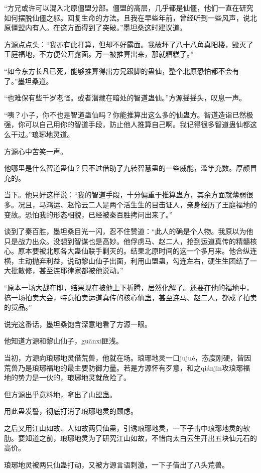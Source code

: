 \begin{this_body}
“方兄或许可以混入北原僵盟分部。僵盟的高层，几乎都是仙僵，他们一直在研究如何摆脱仙僵之躯。回复生命的方法。且我在早些年前，曾经听到一些风声，说北原僵盟内有人。在这方面得到了突破。”墨坦桑这时建议道。

方源点点头：“我亦有此打算，但却不好露面。我破坏了八十八角真阳楼，毁灭了王庭福地，不方便公开露面。万一被推算出来，那就糟糕了。”

“如今东方长凡已死，能够推算得出方兄跟脚的蛊仙，整个北原恐怕都不会有了。”墨坦桑道。

“也难保有些千岁老怪。或者潜藏在暗处的智道蛊仙。”方源摇摇头，叹息一声。

“咦？小子，你不也是智道蛊仙吗？你能推算出这么多的仙蛊方。智道造诣已然极强，你可以自己用你的智道手段，防止他人推算自己啊。我记得很多智道蛊仙都这么干过。”琅琊地灵道。

方源心中苦笑一声。

他哪里是什么智道蛊仙？只不过借助了九转智慧蛊的一些威能，滥竽充数。厚颜冒充的。

当下。他只好这样说：“我的智道手段，十分偏重于推算蛊方，其余方面就薄弱很多。况且，马鸿运、赵怜云二人是两个活生生的目击证人，亲身经历了王庭福地的变故。恐怕我的形态相貌，已经被秦百胜拷问出来了。”

谈到了秦百胜，墨坦桑目光一闪，忍不住赞道：“此人的确是个人物。我原以为他只是战力出众。没想到智谋也是高妙。他俘虏马、赵二人，抢到运道真传的精髓核心。原本要被北原各大蛊仙联手剿灭的。结果北原时间的这一个多月来。他合纵连横，主动抛弃利益，说动黎山仙子出面，利用山盟蛊，勾连左右，硬生生团结了一大批散修，甚至连耶律家都被他说动。”

“原本一场大战在即，结果现在被他上下折腾，居然化解了。还要在他的福地中，搞一场拍卖大会，特意拍卖运道真传的核心仙蛊，甚至连马、赵二人，都成了拍卖的货品。”

说完这番话，墨坦桑饱含深意地看了方源一眼。

他知道方源和黎山仙子，guānxi匪浅。

当初，方源向琅琊地灵借荒兽，他就在场。琅琊地灵一口jujué，态度刚硬，皆因荒兽乃是琅琊福地的最主要防御力量。若是方源怀有歹意，和之qiánjin攻琅琊福地的势力是一伙的，琅琊地灵就危险了。

但方源出乎意料地，拿出了山盟蛊。

用此蛊发誓，彻底打消了琅琊地灵的顾虑。

之后又用江山如故、人如故两只仙蛊，引诱琅琊地灵，一下子击中琅琊地灵的软肋。要知道之前，琅琊地灵为了研究江山如故，不惜向太白云生开出五块仙元石的高价。

琅琊地灵被两只仙蛊打动，又被方源言语刺激，一下子借出了八头荒兽。


\end{this_body}
